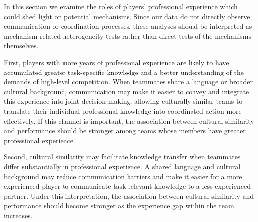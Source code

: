 \documentclass[10pt]{article}
\begin{document}
In this section we examine the roles of players’ professional experience which could shed light on potential mechanisms. Since our data do not directly observe communication or coordination processes, these analyses should be interpreted as mechanism-related heterogeneity tests rather than direct tests of the mechanisms themselves. %




First, players with more years of professional experience are likely to have accumulated greater task-specific knowledge and a better understanding of the demands of high-level competition. When teammates share a language or broader cultural background, communication may make it easier to convey and integrate this experience into joint decision-making, allowing culturally similar teams to translate their individual professional knowledge into coordinated action more effectively. If this channel is important, the association between cultural similarity and performance should be stronger among teams whose members have greater professional experience. 

Second, cultural similarity may facilitate knowledge transfer when teammates differ substantially in professional experience. A shared language and cultural background may reduce communication barriers and make it easier for a more experienced player to communicate task-relevant knowledge to a less experienced partner. Under this interpretation, the association between cultural similarity and performance should become stronger as the experience gap within the team increases. %

\end{document}
